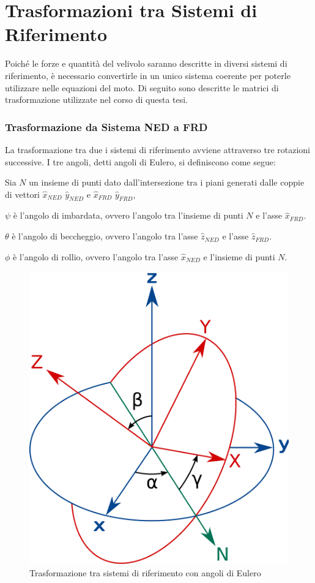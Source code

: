 \section{Trasformazioni tra Sistemi di Riferimento}
Poiché le forze e quantità del velivolo saranno descritte in diversi sistemi di riferimento, è necessario convertirle in un unico sistema coerente per poterle utilizzare nelle equazioni del moto.
Di seguito sono descritte le matrici di trasformazione utilizzate nel corso di questa tesi.

\subsubsection{Trasformazione da Sistema NED a FRD}\label{subsec:Eulero}
La trasformazione tra due i sistemi di riferimento avviene attraverso tre rotazioni successive.
I tre angoli, detti angoli di Eulero, si definiscono come segue:
\begin{note}
    Sia $N$ un insieme di punti dato dall'intersezione tra i piani generati dalle coppie di vettori $\hat{x}_{NED}$ $\hat{y}_{NED}$ e $\hat{x}_{FRD}$ $\hat{y}_{FRD}$,
\end{note}
\begin{sitemize}
    \item $\psi$ è l'angolo di imbardata, ovvero l'angolo tra l'insieme di punti $N$ e l'asse $\hat{x}_{FRD}$.
    \item $\theta$ è l'angolo di beccheggio, ovvero l'angolo tra l'asse $\hat{z}_{NED}$ e l'asse $\hat{z}_{FRD}$.
    \item $\phi$ è l'angolo di rollio, ovvero l'angolo tra l'asse $\hat{x}_{NED}$ e l'insieme di punti $N$.
\end{sitemize}

\begin{figure}[H]
    \centering
    \includegraphics[width=0.35\linewidth]{Immagini/euler_angles.pdf}
    \caption{Trasformazione tra sistemi di riferimento con angoli di Eulero \cite{wiki:eulerangles}}
\end{figure}


